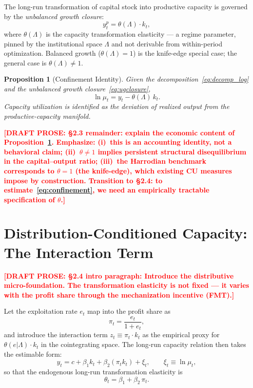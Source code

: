 \documentclass[12pt,letterpaper]{article}
\newcommand{\mut}{\mu_t}           %
\newcommand{\thetaL}{\theta(\Lambda)}  %
\newcommand{\pit}{\pi_t}           %
\newcommand{\draftnote}[1]{%
  \textcolor{red}{\textbf{[DRAFT PROSE: #1]}}}
\newtheorem{proposition}{Proposition}[section]
\begin{document}
The long-run transformation of capital stock into productive capacity is
governed by the \emph{unbalanced growth closure}:
\begin{equation}
  y^p_t = \thetaL \cdot k_t,
  \label{eq:ugclosure}
\end{equation}
where $\thetaL$ is the capacity transformation elasticity — a regime
parameter, pinned by the institutional space $\Lambda$ and not derivable
from within-period optimization.
Balanced growth ($\thetaL = 1$) is the knife-edge special case;
the general case is $\thetaL \neq 1$.

\begin{proposition}[Confinement Identity]
\label{prop:confinement}
Given the decomposition~\eqref{eq:decomp_log} and the unbalanced growth
closure~\eqref{eq:ugclosure},
\begin{equation}
  \ln\mut = y_t - \thetaL\, k_t.
  \label{eq:confinement}
\end{equation}
Capacity utilization is identified as the deviation of realized output from
the productive-capacity manifold.
\end{proposition}

\draftnote{§2.3 remainder: explain the economic content of
  Proposition~\ref{prop:confinement}. Emphasize: (i)~this is an accounting
  identity, not a behavioral claim; (ii)~$\theta\neq 1$ implies persistent
  structural disequilibrium in the capital--output ratio; (iii)~the
  Harrodian benchmark corresponds to $\theta = 1$ (the knife-edge), which
  existing CU measures impose by construction. Transition to §2.4:
  to estimate~\eqref{eq:confinement}, we need an empirically tractable
  specification of $\theta$.}


\section{Distribution-Conditioned Capacity: The Interaction Term}
\label{sec:distribution}

\draftnote{§2.4 intro paragraph: Introduce the distributive micro-foundation.
  The transformation elasticity is not fixed — it varies with the profit share
  through the mechanization incentive (FMT).}

Let the exploitation rate $e_t$ map into the profit share as
\begin{equation}
  \pit = \frac{e_t}{1 + e_t},
  \label{eq:profitshare}
\end{equation}
and introduce the interaction term $z_t \equiv \pit \cdot k_t$ as the
empirical proxy for $\theta(e|\Lambda)\cdot k_t$ in the cointegrating space.
The long-run capacity relation then takes the estimable form:
\begin{equation}
  y_t = c + \beta_1 k_t + \beta_2(\pit k_t) + \xi_t,
  \qquad
  \xi_t \equiv \ln\mut,
  \label{eq:cv}
\end{equation}
so that the endogenous long-run transformation elasticity is
\begin{equation}
  \theta_t = \beta_1 + \beta_2\, \pit.
  \label{eq:theta_linear}
\end{equation}
\end{document}
